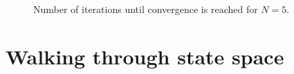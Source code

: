 \documentclass[11pt, a4paper]{report} %
\begin{document}
\begin{figure}[tb!]
  \centering
  \\
  \\
  \\
  \caption{Number of iterations until convergence is reached for \(N=5\).}
\end{figure}

\section{Walking through state space}
\end{document}
